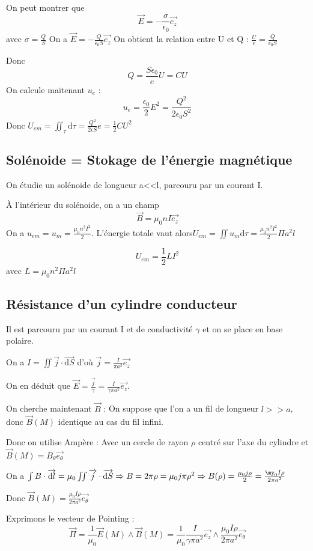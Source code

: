 \documentclass[french]{yLectureNote}
\renewcommand{\vec}{\overrightarrow}
\newcommand{\dd}{\mathrm{d}}
\newcommand{\E}{\vec{E}(M)}
\newcommand{\B}{\vec{B}(M)}
\begin{document}
On peut montrer que 
$$ \vec{E} = -\frac{\sigma}{\epsilon_0}\vec{e_z}$$ avec $\sigma = \frac{Q}{S}$
On a $\vec{E} = -\frac{Q}{\epsilon_0 S}\vec{e_z}$
On obtient la relation entre U et Q : $\frac{U}{e} = \frac{Q}{\epsilon_0 S}$

Donc $$Q = \frac{S\epsilon_0}{e} U = CU$$
On calcule maitenant $u_e$ :
$$u_e = \frac{\epsilon_0}{2}E^2 = \frac{Q^2}{2\epsilon_0 S^2}$$
Donc $U_{em} = \iint_{\tau}\dd \tau = \frac{Q^2}{2\epsilon S}e = \frac12 CU^2$
\subsection{Solénoide = Stokage de l'énergie magnétique}
On étudie un solénoide de longueur a<<l, parcouru par un courant I.

À l'intérieur du solénoide, on a un champ
$$\vec{B} = \mu_0n I\vec{e_z}$$On a 
$u_{em} = u_m = \frac{\mu_0 n^2I^2}{2} $. L'énergie totale vaut alors$U_{em} = \iint u_m \dd \tau = \frac{\mu_0 n^2I^2}{2}\Pi a^2 l$

$$U_{em} = \frac12 L I^2 $$ avec $L = \mu_0 n^2 \Pi a^ 2l$

\subsection{Résistance d'un cylindre conducteur}
Il est parcouru par un courant I et de conductivité $\gamma$ et on se place en base polaire.

On a $I =\iint \vec{j}\cdot \vec{\dd S}$ d'où $\vec{j} = \frac{I}{\pi a^2}\vec{e_z}$

On en déduit que $\vec{E} = \frac{\vec{j}}{\gamma} = \frac{I}{\gamma \pi a^2}\vec{e_z}$.

On cherche maintenant $\vec{B}$ : On suppose que l'on a un fil de longueur $l>>a$, donc $\B$ identique au cas du fil infini.

Donc on utilise Ampère : Avec un cercle de rayon $\rho$ centré sur l'axe du cylindre et $\B = B_{\theta}\vec{e_{\theta}}$

On a $\int B\cdot \vec{\dd l} = \mu_0 \iint \vec{j}\cdot \vec{\dd S} \Rightarrow B=2\pi\rho = \mu_0 j\pi \rho^2 \Rightarrow B(\rho) = \frac{\mu_0 j\rho}{2} = \frac{\my_0 I\rho }{2\pi a^2}$

Donc $\B = \frac{\mu_0 I\rho}{2\pi a^2}\vec{e_\theta}$

Exprimons le vecteur de Pointing :
$$\vec{\Pi} = \frac{1}{\mu_0}\E\wedge \B = \frac{1}{\mu_0} \frac{I}{\gamma \pi a^2}\vec{e_z}\wedge \frac{\mu_0 I\rho}{2\pi a^2}\vec{e_{\theta}}$$
\end{document}

